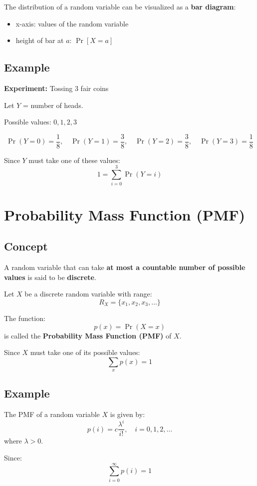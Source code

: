 \documentclass[11pt]{article}
\begin{document}
The distribution of a random variable can be visualized as a \textbf{bar diagram}:
\begin{itemize}[leftmargin=1.5em]
    \item x-axis: values of the random variable
    \item height of bar at $a$: $\Pr[X = a]$
\end{itemize}

\subsection{Example}

\textbf{Experiment:} Tossing 3 fair coins  

Let $Y$ = number of heads.

Possible values: $0, 1, 2, 3$

\[
\Pr(Y=0)=\frac{1}{8}, \quad
\Pr(Y=1)=\frac{3}{8}, \quad
\Pr(Y=2)=\frac{3}{8}, \quad
\Pr(Y=3)=\frac{1}{8}
\]

Since $Y$ must take one of these values:
\[
1 = \sum_{i=0}^{3} \Pr(Y=i)
\]

\section{Probability Mass Function (PMF)}

\subsection{Concept}

A random variable that can take \textbf{at most a countable number of possible values} is said to be \textbf{discrete}.

Let $X$ be a discrete random variable with range:
\[
R_X = \{x_1, x_2, x_3, \ldots\}
\]

The function:
\[
p(x) = \Pr(X = x)
\]
is called the \textbf{Probability Mass Function (PMF)} of $X$.

Since $X$ must take one of its possible values:
\[
\sum_x p(x) = 1
\]

\subsection{Example}

The PMF of a random variable $X$ is given by:
\[
p(i) = c \frac{\lambda^i}{i!}, \quad i = 0,1,2,\ldots
\]
where $\lambda > 0$.

Since:
\[
\sum_{i=0}^{\infty} p(i) = 1
\]
\end{document}
